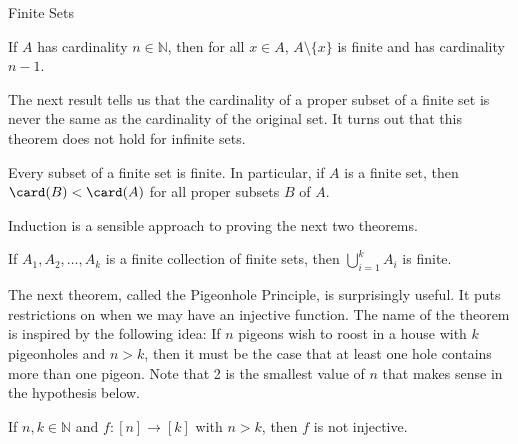 \begin{section}{Finite Sets}
\begin{theorem}\label{thm:decreaseCardinality}
If $A$ has cardinality $n\in\mathbb{N}$, then for all $x\in A$, $A\setminus \{x\}$ is finite and has cardinality $n-1$. 
\end{theorem}

The next result tells us that the cardinality of a proper subset of a finite set is never the same as the cardinality of the original set.  It turns out that this theorem does not hold for infinite sets. 

\begin{theorem}\label{thm:cardinalityProperSubsetsFinite}
Every subset of a finite set is finite. In particular, if $A$ is a finite set, then $\card(B)<\card(A)$ for all proper subsets $B$ of $A$.
\end{theorem}

Induction is a sensible approach to proving the next two theorems.

\begin{theorem}
If $A_1,A_2,\ldots, A_k$ is a finite collection of finite sets, then $\displaystyle \bigcup_{i=1}^k A_i$ is finite.
\end{theorem}

The next theorem, called the Pigeonhole Principle, is surprisingly useful. It puts restrictions on when we may have an injective function. The name of the theorem is inspired by the following idea: If $n$ pigeons wish to roost in a house with $k$ pigeonholes and $n>k$, then it must be the case that at least one hole contains more than one pigeon.  Note that 2 is the smallest value of $n$ that makes sense in the hypothesis below.

\begin{theorem}
If $n,k\in\mathbb{N}$ and $f:[n]\to [k]$ with $n>k$, then $f$ is not injective.
\end{theorem}

\end{section}